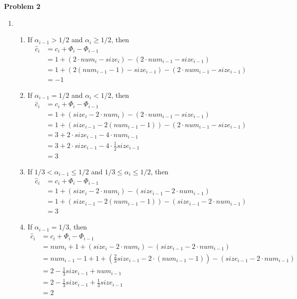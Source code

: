 \documentclass[12pt,letterpaper]{article}
\def\pp{\par\noindent}
\newcommand{\problem}[1]{ \bigskip \pp \textbf{Problem #1}\par}
\begin{document}
\problem{2}
\begin{enumerate}
	\item
		\begin{enumerate}
			\item If $\alpha_{i-1}>1/2$ and $\alpha_i\geq1/2$, then
				\begin{align*}
					\widehat{c}_i&=c_i+\Phi_i-\Phi_{i-1}\\
					&=1+(2\cdot num_i-size_i)-(2\cdot num_{i-1}-size_{i-1})\\
					&=1+(2(num_{i-1}-1)-size_{i-1})-(2\cdot num_{i-1}-size_{i-1})\\
					&=-1
				\end{align*}
			\item If $\alpha_{i-1}=1/2$ and $\alpha_i<1/2$, then
				\begin{align*}
					\widehat{c}_i&=c_i+\Phi_i-\Phi_{i-1}\\
					&=1+(size_i-2\cdot num_i)-(2\cdot num_{i-1}-size_{i-1})\\
					&=1+(size_{i-1}-2(num_{i-1}-1))-(2\cdot num_{i-1}-size_{i-1})\\
					&=3+2\cdot size_{i-1}-4\cdot num_{i-1}\\
					&=3+2\cdot size_{i-1}-4\cdot\frac{1}{2}size_{i-1}\\
					&=3
				\end{align*}
			\item If $1/3<\alpha_{i-1}\leq1/2$ and $1/3\leq\alpha_i\leq1/2$, then
				\begin{align*}
					\widehat{c}_i&=c_i+\Phi_i-\Phi_{i-1}\\
					&=1+(size_i-2\cdot num_i)-(size_{i-1}-2\cdot num_{i-1})\\
					&=1+(size_{i-1}-2(num_{i-1}-1))-(size_{i-1}-2\cdot num_{i-1})\\
					&=3
				\end{align*}
			\item If $\alpha_{i-1}=1/3$, then
				\begin{align*}
					\widehat{c}_i&=c_i+\Phi_i-\Phi_{i-1}\\
					&=num_i+1+(size_i-2\cdot num_i)-(size_{i-1}-2\cdot num_{i-1})\\
					&=num_{i-1}-1+1+(\frac{2}{3}size_{i-1}-2\cdot(num_{i-1}-1))-(size_{i-1}-2\cdot num_{i-1})\\
					&=2-\frac{1}{3}size_{i-1}+num_{i-1}\\
					&=2-\frac{1}{3}size_{i-1}+\frac{1}{3}size_{i-1}\\
					&=2
				\end{align*}

\end{enumerate}
\end{enumerate}
\end{document}
